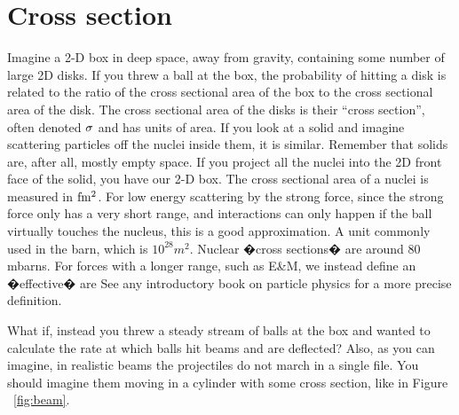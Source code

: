 \section{Cross section}
Imagine a 2-D box in deep space, away from gravity, containing some number of large 2D disks.  If you threw a ball at the box, the probability of hitting a disk is related to the ratio of the cross sectional area of the box to the cross sectional area of the disk.  The cross sectional area of the disks is their 
``cross section'', often denoted ${\rm \sigma}$ and has units of area.  
If you look at a solid and imagine scattering particles off the nuclei inside them, it is similar.  Remember that solids are, after all, mostly empty space.  If you project all the nuclei into the 2D front face of the solid, you have our 2-D box.  The cross sectional area of a nuclei is measured in ${\rm fm^{2}}$.  
For low energy scattering by the strong force, since the strong force only has a very short range, and interactions can only happen if the ball virtually touches the nucleus, this is a good approximation.  A unit commonly used in the barn, which is \(10^{28} m^{2}\).  Nuclear �cross sections� are around 80 mbarns.  For forces with a longer range, such as E\&M, we instead define an �effective� are See any introductory book on particle physics for a more precise definition.

What if, instead you threw a steady stream of balls at the box and wanted to calculate the rate at which balls hit beams and are deflected?  Also, as you can imagine, in realistic beams the projectiles do not march in a single file.  You should imagine them moving in a cylinder with some cross section, like in Figure ~\ref{fig:beam}.
 
